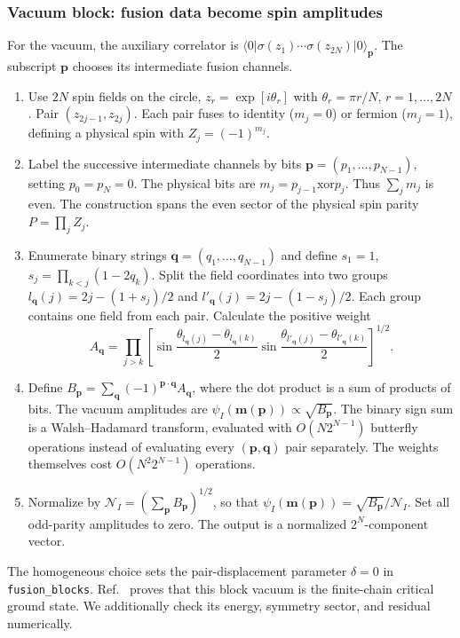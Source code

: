 \subsubsection{Vacuum block: fusion data become spin amplitudes}
For the vacuum, the auxiliary correlator is
$\langle0|\sigma(z_1)\cdots\sigma(z_{2N})|0\rangle_{\bm p}$.
The subscript $\bm p$ chooses its intermediate fusion channels.
\begin{enumerate}
\item Use $2N$ spin fields on the circle,
$z_r=\exp[i\theta_r]$ with $\theta_r=\pi r/N$, $r=1,\ldots,2N$.
Pair $(z_{2j-1},z_{2j})$. Each pair fuses to identity ($m_j=0$) or
fermion ($m_j=1$), defining a physical spin with $Z_j=(-1)^{m_j}$.
\item Label the successive intermediate channels by bits
$\bm p=(p_1,\ldots,p_{N-1})$, setting $p_0=p_N=0$.
The physical bits are $m_j=p_{j-1}\mathbin{\mathrm{xor}}p_j$.
Thus $\sum_jm_j$ is even. The construction spans the even sector of the
physical spin parity $P=\prod_j Z_j$.
\item Enumerate binary strings $\bm q=(q_1,\ldots,q_{N-1})$ and define
$s_1=1$, $s_j=\prod_{k<j}(1-2q_k)$.
Split the field coordinates into two groups
$l_{\bm q}(j)=2j-(1+s_j)/2$ and
$l'_{\bm q}(j)=2j-(1-s_j)/2$. Each group contains one field from each pair.
Calculate the positive weight
\begin{equation}
 A_{\bm q}=\prod_{j>k}
 \left[\sin\frac{\theta_{l_{\bm q}(j)}-\theta_{l_{\bm q}(k)}}2
 \sin\frac{\theta_{l'_{\bm q}(j)}-\theta_{l'_{\bm q}(k)}}2\right]^{1/2}.
\end{equation}
\item Define $B_{\bm p}=\sum_{\bm q}(-1)^{\bm p\cdot\bm q}A_{\bm q}$,
where the dot product is a sum of products of bits. The vacuum amplitudes
are $\psi_I(\bm m(\bm p))\propto\sqrt{B_{\bm p}}$.
The binary sign sum is a Walsh--Hadamard transform, evaluated with
$O(N2^{N-1})$ butterfly operations instead of evaluating every
$(\bm p,\bm q)$ pair separately.
The weights themselves cost $O(N^2 2^{N-1})$ operations.
\item Normalize by
$\mathcal N_I=(\sum_{\bm p}B_{\bm p})^{1/2}$, so that
$\psi_I(\bm m(\bm p))=\sqrt{B_{\bm p}}/\mathcal N_I$.
Set all odd-parity amplitudes to zero. The output is a normalized
$2^N$-component vector.
\end{enumerate}
The homogeneous choice sets the pair-displacement parameter $\delta=0$ in
\texttt{fusion\_blocks}. Ref.~\cite{Montes2017} proves that this block
vacuum is the finite-chain critical ground state. We additionally check
its energy, symmetry sector, and residual numerically.

